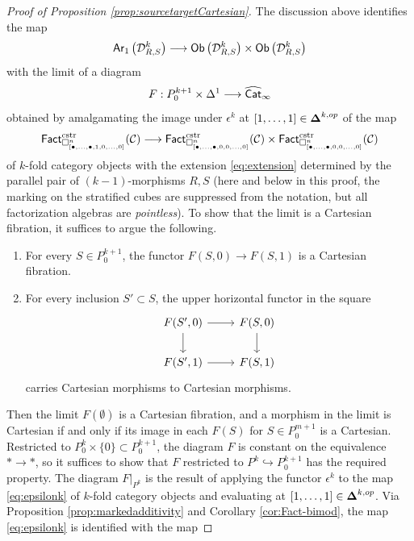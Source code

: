 \documentclass[10pt, reqno, twoside
, final
]{amsart}
\numberwithin{equation}{subsection}%
\theoremstyle{definition}
\theoremstyle{definition}
\theoremstyle{definition}
\theoremstyle{definition}
\theoremstyle{definition}
\theoremstyle{definition}
\theoremstyle{definition}
\theoremstyle{definition}
\theoremstyle{definition}
\theoremstyle{plain}
\theoremstyle{definition}
\theoremstyle{plain}
\theoremstyle{definition}
\theoremstyle{plain}
\theoremstyle{definition}
\theoremstyle{definition}
\theoremstyle{plain}
\theoremstyle{plain}
\theoremstyle{definition}
\theoremstyle{plain}
\theoremstyle{plain}
\theoremstyle{plain}
\begin{document}
\begin{proof}[Proof of Proposition \ref{prop:sourcetargetCartesian}]
The discussion above identifies the map 
\[ \mathsf{Ar}_1\left(\mathcal{D}^k_{R,S}\right) \longrightarrow \mathsf{Ob}\left(\mathcal{D}^k_{R,S}\right)\times \mathsf{Ob}\left(\mathcal{D}^k_{R,S}\right)  \]
with the limit of a diagram 
\[  F:P^{k+1}_0 \times \Delta^1\longrightarrow \widehat{\mathsf{Cat}}_{\infty} \]
obtained by amalgamating the image under $\epsilon^k$ at $[1,\ldots,1]\in \boldsymbol{\Delta}^{k,op}$ of the map \begin{equation}\label{eq:epsilonk}\mathsf{Fact}^{\mathrm{cstr}}_{\square^n_{[\bullet,\ldots,\bullet,1,0,\ldots,0]}}(\mathcal{C}) \longrightarrow   \mathsf{Fact}^{\mathrm{cstr}}_{\square^n_{[\bullet,\ldots,\bullet,0,0,\ldots,0]}}(\mathcal{C})\times\mathsf{Fact}^{\mathrm{cstr}}_{\square^n_{[\bullet,\ldots,\bullet,0,0,\ldots,0]}}(\mathcal{C})\end{equation}
of $k$-fold category objects with the extension \eqref{eq:extension} determined by the parallel pair of $(k-1)$-morphisms $R,S$ (here and below in this proof, the marking on the stratified cubes are suppressed from the notation, but all factorization algebras are \emph{pointless}). To show that the limit is a Cartesian fibration, it suffices to argue the following.
\begin{enumerate}[$(1)$]
    \item For every $S\in P^{k+1}_0$, the functor $F(S,0)\rightarrow F(S,1)$ is a Cartesian fibration.
    \item For every inclusion $S'\subset S$, the upper horizontal functor in the square
    \[
    \begin{tikzcd}
    F(S',0) \ar[r] \ar[d] & F(S,0) \ar[d] \\
    F(S',1) \ar[r] & F(S,1)
    \end{tikzcd}    
    \]
    carries Cartesian morphisms to Cartesian morphisms.
\end{enumerate}
Then the limit $F(\emptyset)$ is a Cartesian fibration, and a morphism in the limit is Cartesian if and only if its image in each $F(S)$ for $S\in P^{m+1}_0$ is a Cartesian. Restricted to $P^k_0\times \{0\}\subset P^{k+1}_0$, the diagram $F$ is constant on the equivalence $*\rightarrow *$, so it suffices to show that $F$ restricted to $P^k\hookrightarrow P^{k+1}_0$ has the required property. The diagram $F|_{P^k}$ is the result of applying the functor $\epsilon^k$ to the map \eqref{eq:epsilonk} of $k$-fold category objects and evaluating at $[1,\ldots,1]\in\boldsymbol{\Delta}^{k,op}$. Via Proposition \ref{prop:markedadditivity} and Corollary \ref{cor:Fact-bimod}, the map \eqref{eq:epsilonk} is identified with the map 

\end{proof}
\end{document}
